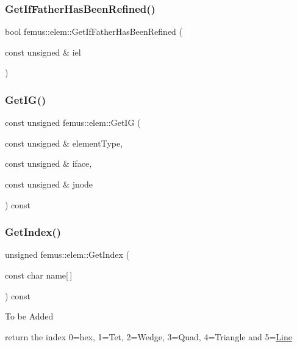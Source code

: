 \subsubsection{\texorpdfstring{Get\+If\+Father\+Has\+Been\+Refined()}{GetIfFatherHasBeenRefined()}}
{\footnotesize\ttfamily bool femus\+::elem\+::\+Get\+If\+Father\+Has\+Been\+Refined (\begin{DoxyParamCaption}\item[{const unsigned \&}]{iel }\end{DoxyParamCaption})\hspace{0.3cm}{\ttfamily [inline]}}

\mbox{\label{classfemus_1_1elem_a9b4bb98c0365d283a502ed4dc3c43db7}} 
\subsubsection{\texorpdfstring{Get\+I\+G()}{GetIG()}}
{\footnotesize\ttfamily const unsigned femus\+::elem\+::\+Get\+IG (\begin{DoxyParamCaption}\item[{const unsigned \&}]{element\+Type,  }\item[{const unsigned \&}]{iface,  }\item[{const unsigned \&}]{jnode }\end{DoxyParamCaption}) const}

\mbox{\label{classfemus_1_1elem_aefab7a6647d4a5a2c4b1eee9c6d9e3da}} 
\subsubsection{\texorpdfstring{Get\+Index()}{GetIndex()}}
{\footnotesize\ttfamily unsigned femus\+::elem\+::\+Get\+Index (\begin{DoxyParamCaption}\item[{const char}]{name\mbox{[}$\,$\mbox{]} }\end{DoxyParamCaption}) const}

To be Added

return the index 0=hex, 1=Tet, 2=Wedge, 3=Quad, 4=Triangle and 5=\mbox{\hyperlink{classfemus_1_1_line}{Line}} \mbox{\label{classfemus_1_1elem_a40dd00e3077c184757d342bfbf33fefc}} 
